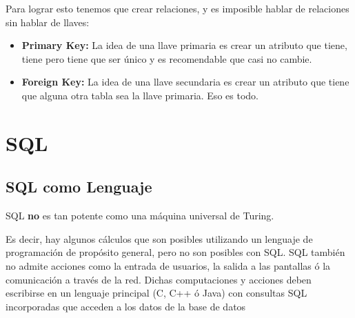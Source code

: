 \documentclass[12pt, fleqn]{report}                             %
\begin{document}
                Para lograr esto tenemos que crear relaciones, y es imposible hablar de relaciones
                sin hablar de llaves:


                \begin{itemize}
                    \item
                        \textbf{Primary Key:}
                        La idea de una llave primaria es crear un atributo que tiene, tiene pero
                        tiene que ser único y es recomendable que casi no cambie.


                    \item
                        \textbf{Foreign Key:}
                        La idea de una llave secundaria es crear un atributo que tiene que alguna otra
                        tabla sea la llave primaria. Eso es todo.

                \end{itemize}


 










            
        





    \chapter{SQL}

        \clearpage
        \section{SQL como Lenguaje}
            
            SQL \textbf{no} es tan potente como una máquina universal de Turing.

            Es decir, hay algunos cálculos que son posibles utilizando un lenguaje de programación
            de propósito general, pero no son posibles con SQL.
            SQL también no admite acciones como la entrada de usuarios, la salida a las pantallas 
            ó la comunicación a través de la red.
            Dichas computaciones y acciones deben escribirse en un lenguaje principal (C, C++ ó Java)
            con consultas SQL incorporadas que acceden a los datos de la base de datos
\end{document}
